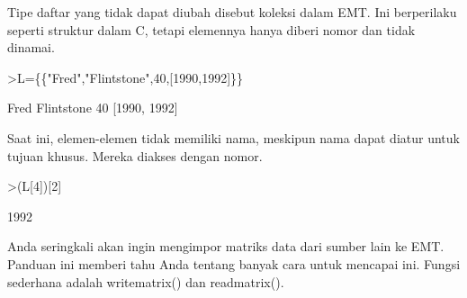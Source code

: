 \documentclass[12pt,arial,letterpaper]{book}
\begin{document}
\begin{eulercomment}
\begin{eulercomment}
\begin{eulercomment}
\begin{eulercomment}
\begin{eulercomment}
\begin{eulercomment}
\begin{eulercomment}
\begin{eulercomment}
\begin{eulercomment}
\begin{eulercomment}
\begin{eulercomment}
\begin{eulercomment}
\begin{eulercomment}
\begin{eulercomment}
\begin{eulercomment}
\begin{eulercomment}
\begin{eulercomment}
\begin{eulercomment}
\begin{eulercomment}
\begin{eulercomment}
\begin{eulercomment}
\begin{eulercomment}
\begin{eulercomment}
\begin{eulercomment}
\begin{eulercomment}
\begin{eulercomment}
\begin{eulercomment}
\begin{eulercomment}
\begin{eulercomment}
\begin{eulercomment}
\begin{eulercomment}
\begin{eulercomment}
\begin{eulercomment}
\begin{eulercomment}
\begin{eulercomment}
\begin{eulercomment}
\begin{eulercomment}
Tipe daftar yang tidak dapat diubah disebut koleksi dalam EMT. Ini
berperilaku seperti struktur dalam C, tetapi elemennya hanya diberi
nomor dan tidak dinamai.
\end{eulercomment}
\begin{eulerprompt}
>L=\{\{"Fred","Flintstone",40,[1990,1992]\}\}
\end{eulerprompt}
\begin{euleroutput}
  Fred
  Flintstone
  40
  [1990,  1992]
\end{euleroutput}
\begin{eulercomment}
Saat ini, elemen-elemen tidak memiliki nama, meskipun nama dapat
diatur untuk tujuan khusus. Mereka diakses dengan nomor.
\end{eulercomment}
\begin{eulerprompt}
>(L[4])[2]
\end{eulerprompt}
\begin{euleroutput}
  1992
\end{euleroutput}
\begin{eulercomment}
\begin{eulercomment}
\begin{eulercomment}
Anda seringkali akan ingin mengimpor matriks data dari sumber lain ke
EMT. Panduan ini memberi tahu Anda tentang banyak cara untuk mencapai
ini. Fungsi sederhana adalah writematrix() dan readmatrix().


\end{eulercomment}
\end{eulercomment}
\end{eulercomment}
\end{eulercomment}
\end{eulercomment}
\end{eulercomment}
\end{eulercomment}
\end{eulercomment}
\end{eulercomment}
\end{eulercomment}
\end{eulercomment}
\end{eulercomment}
\end{eulercomment}
\end{eulercomment}
\end{eulercomment}
\end{eulercomment}
\end{eulercomment}
\end{eulercomment}
\end{eulercomment}
\end{eulercomment}
\end{eulercomment}
\end{eulercomment}
\end{eulercomment}
\end{eulercomment}
\end{eulercomment}
\end{eulercomment}
\end{eulercomment}
\end{eulercomment}
\end{eulercomment}
\end{eulercomment}
\end{eulercomment}
\end{eulercomment}
\end{eulercomment}
\end{eulercomment}
\end{eulercomment}
\end{eulercomment}
\end{eulercomment}
\end{eulercomment}
\end{eulercomment}
\end{document}
